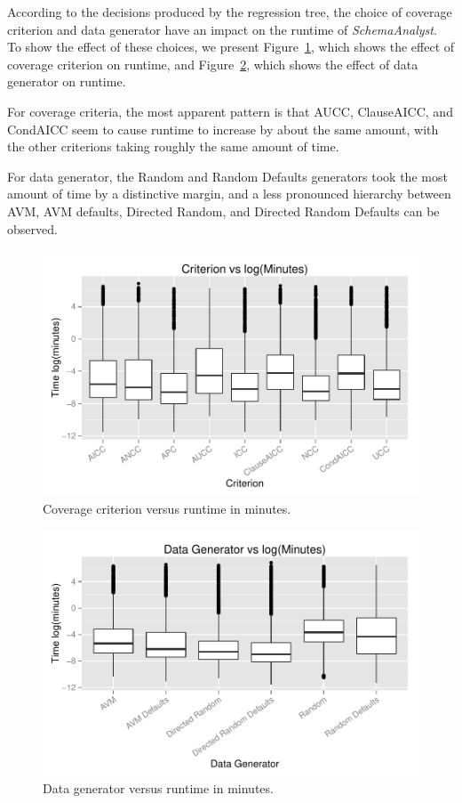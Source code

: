 
According to the decisions produced by the regression tree, the choice of coverage criterion and data generator have an
impact on the runtime of \textit{SchemaAnalyst}. To show the effect of these choices, we present
Figure~\ref{fig:crites}, which shows the effect of coverage criterion on runtime, and Figure~\ref{fig:datas}, which
shows the effect of data generator on runtime.

For coverage criteria, the most apparent pattern is that AUCC, ClauseAICC, and CondAICC seem to cause runtime to
increase by about the same amount, with the other criterions taking roughly the same amount of time.

For data generator, the Random and Random Defaults generators took the most amount of time by a distinctive margin, and
a less pronounced hierarchy between AVM, AVM defaults, Directed Random, and Directed Random Defaults can be observed.


\begin{figure}
\centering
  \centering
  \includegraphics[width=1\linewidth]{diagrams/CriterionvsTime.pdf}
  \caption{Coverage criterion versus runtime in minutes.\vspace{-.15in}}
  \label{fig:crites}
  \vspace{-.15in}
\end{figure}

\begin{figure}
\centering
  \centering
  \includegraphics[width=1\linewidth]{diagrams/DataGeneratorvsTime.pdf}
  \caption{Data generator versus runtime in minutes.\vspace{-.15in}}
  \label{fig:datas}
  \vspace{-.15in}
\end{figure}
